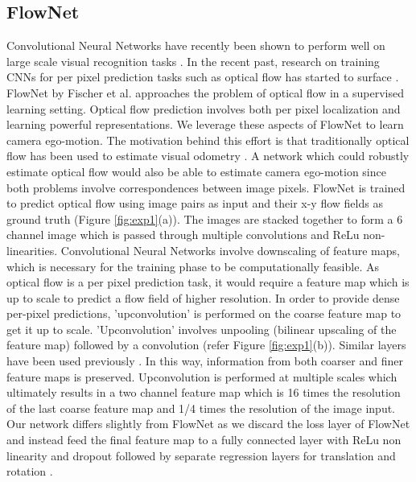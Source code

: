 \documentclass[usletter, 10 pt, conference]{ieeeconf}  %
\begin{document}
\subsection{FlowNet}
Convolutional Neural Networks have recently been shown to perform well on large scale visual recognition tasks \cite{krizhevsky2012imagenet}. In the recent past, research on training CNNs for per pixel prediction tasks such as optical flow has started to surface \cite{dosovitskiy2015flownet}. FlowNet by Fischer et al. \cite{dosovitskiy2015flownet} approaches the problem of optical flow in a supervised learning setting. Optical flow prediction involves both per pixel localization and learning powerful representations. We leverage these aspects of FlowNet to learn camera ego-motion. The motivation behind this effort is that traditionally optical flow has been used to estimate visual odometry \cite{campbell2004techniques}. A network which could robustly estimate optical flow would also be able to estimate camera ego-motion since both problems involve correspondences between image pixels. FlowNet is trained to predict optical flow using image pairs as input and their x-y flow fields as ground truth (Figure \ref{fig:exp1}(a)). The images are stacked together to form a 6 channel image which is passed through multiple convolutions and ReLu non-linearities. Convolutional Neural Networks involve downscaling of feature maps, which is necessary for the training phase to be computationally feasible. As optical flow is a per pixel prediction task, it would require a feature map which is up to scale to predict a flow field of higher resolution. In order to provide dense per-pixel predictions, 'upconvolution' is performed on the coarse feature map to get it up to scale. 'Upconvolution' involves unpooling (bilinear upscaling of the feature map) followed by a convolution (refer Figure \ref{fig:exp1}(b)). Similar layers have been used previously \cite{dosovitskiy2015learning}. In this way, information from both coarser and finer feature maps is preserved. Upconvolution is performed at multiple scales which ultimately results in a two channel feature map which is 16 times the resolution of the last coarse feature map and 1/4 times the resolution of the image input. 
Our network differs slightly from FlowNet as we discard the loss layer of FlowNet and instead feed the final feature map to a fully connected layer with ReLu non linearity and dropout followed by separate regression layers for translation and rotation \cite{kendall2015posenet}.
  
\end{document}
